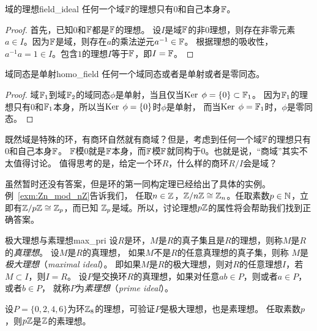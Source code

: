 \begin{proposition}{域的理想}{field_ideal}
任何一个域${\mathbb F}$的理想只有$0$和自己本身${\mathbb F}$。
\end{proposition}
\begin{proof}
首先，已知$0$和${\mathbb F}$都是${\mathbb F}$的理想。
设$I$是域${\mathbb F}$的非$0$理想，则存在非零元素$a \in I$。因为${\mathbb F}$是域，则存在$a$的乘法逆元$a^{-1} \in {\mathbb F}$。
根据理想的吸收性，$a^{-1}a = 1 \in I$。包含$1$的理想$I$等于${\mathbb F}$，即$I = {\mathbb F}$。
\end{proof}

\begin{proposition}{域同态是单射}{homo_field}
任何一个域同态或者是单射或者是零同态。
\end{proposition}

\begin{proof}
域${\mathbb F}_1$到域${\mathbb F}_2$的域同态$\phi$是单射，当且仅当$\operatorname{Ker}\; \phi = \{0\} \subset {\mathbb F}_1$。
因为${\mathbb F}_1$的理想只有$0$和${\mathbb F}_1$本身，所以当$\operatorname{Ker}\; \phi = \{0\} $时$\phi$是单射，
而当$\operatorname{Ker}\; \phi = {\mathbb F}_1$时，$\phi$是零同态。
\end{proof}

既然域是特殊的环，有商环自然就有商域？但是，考虑到任何一个域${\mathbb F}$的理想只有$0$和自己本身${\mathbb F}$。
${\mathbb F}$模$0$就是${\mathbb F}$本身，而${\mathbb F}$模${\mathbb F}$就同构于$0$。也就是说，“商域”其实不太值得讨论。
值得思考的是，给定一个环$R$，什么样的商环$R/I$会是域？

虽然暂时还没有答案，但是环的第一同构定理已经给出了具体的实例。例~\ref{exm:Zn_mod_nZ}告诉我们，
任取$n \in {\mathbb Z}$，${\mathbb Z} / n {\mathbb Z} \cong {\mathbb Z}_n$。任取素数$p \in {\mathbb N}$，立即有${\mathbb Z} / p{\mathbb Z} \cong {\mathbb Z}_p$，而已知
${\mathbb Z}_p$是域。所以，讨论理想$p{\mathbb Z}$的属性将会帮助我们找到正确答案。

\begin{definition}{极大理想与素理想}{max_pri}
设$R$是环，$M$是$R$的真子集且是$R$的理想，则称$M$是$R$的\emph{真理想}。
设$M$是$R$的真理想，
如果$M$不是$R$的任意真理想的真子集，则称
$M$是\emph{极大理想}（\emph{maximal ideal}）。
即如果$M$是$R$的极大理想，则对$R$的任意理想$I$，若$M \subset I$，则$I = R$。
设$P$是交换环$R$的真理想，如果对任意$ab \in P$，则或者$a \in P$，或者$b \in P$，
就称$P$为\emph{素理想}（\emph{prime ideal}）。
\end{definition}

\begin{example}
设$P = \{0, 2, 4, 6\}$为环${\mathbb Z}_8$的理想，可验证$P$是极大理想，也是素理想。
任取素数$p$，则$p {\mathbb Z}$是${\mathbb Z}$的素理想。
\end{example}

